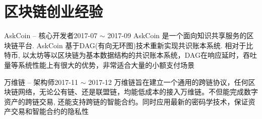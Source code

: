 \documentclass[10pt,a4paper]{moderncv}
\begin{document}

\vspace*{0.4\baselineskip}
\section{区块链创业经验}
\vspace*{0.2\baselineskip}
{ AskCoin -- 核心开发者}{2017-07 $\sim$ 2017-09}{}{}
{AskCoin 是一个面向知识共享服务的区块链平台. AskCoin 基于DAG(有向无环图)技术重新实现共识账本系统. 相对于比特币, 以太坊等以区块链为基本数据结构的共识账本系统，DAG在响应延时，吞吐量等系统性能上有很大的优势，非常适合大量的小额支付场景}
\vspace{1ex}

{万维链 -- 架构师}{2017-11 $\sim$ 2017-12}{}{}
{万维链旨在建立一个通用的跨链协议，任何区块链网络，无论公有链、还是联盟链，均能低成本的接入万维链。不但能完成数字资产的跨链交易, 还能支持跨链的智能合约。同时应用最新的密码学技术，保证资产交易和智能合约的隐私性}
\vspace{1ex}
\end{document}
